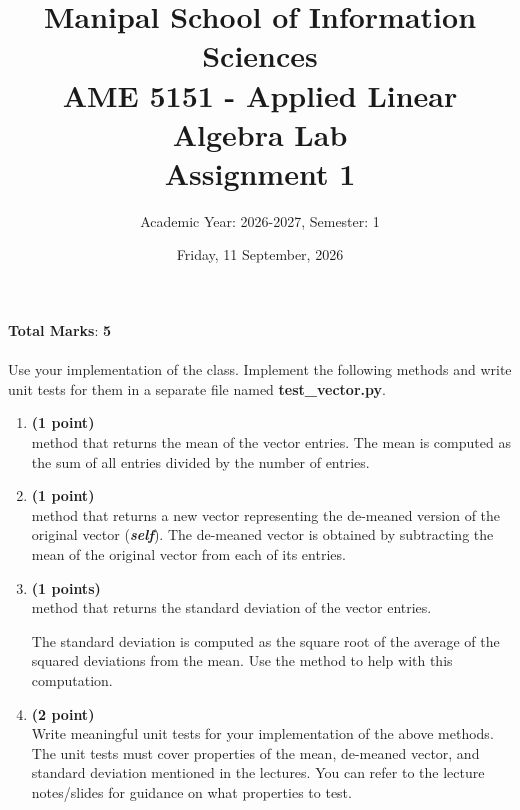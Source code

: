 \documentclass[12pt]{article}
\title{Manipal School of Information Sciences\\AME 5151 - Applied Linear Algebra Lab\vspace*{1em}\\Assignment 1\\}
\author{Academic Year: 2026-2027, Semester: 1}
\date{Friday, 11 September, 2026}
\begin{document}
\pagecolor{white!2}

\maketitle

\vspace*{-1em}\noindent{\color{black!70}{\rule{\textwidth}{0.8pt}}}

{}

\vspace*{1.5em}
\noindent\hfill {\textbf{Total Marks}: \textbf{5}}
\vspace*{-4pt}\\
\noindent{\color{black!70}{\rule{\textwidth}{0.8pt}}}\\


\noindent Use your implementation of the {\color{blue}{Vector}} class.
Implement the following methods and write unit tests for them
in a separate file named \textbf{test\_vector.py}.

\begin{enumerate}
    \item \textbf{(1 point)} \\
        {} method
        that returns the mean of the vector entries.
        The mean is computed as the sum of all entries divided by
        the number of entries.

    \item \textbf{(1 point)} \\
        {} method that
        returns a new vector representing the de-meaned version
        of the original vector ({\color{black!80}\textbf{\textit{self}}}).
        The de-meaned vector is obtained by subtracting the mean
        of the original vector from each of its entries.

    \item \textbf{(1 points)} \\
        {} method
        that returns the standard deviation of the vector entries.

        The standard deviation is computed as the square root of the
        average of the squared deviations from the mean.
        Use the {} method to help
        with this computation.

    \item \textbf{(2 point)} \\
         Write meaningful unit tests for your implementation of
         the above methods.
         The unit tests must cover properties of the mean, de-meaned vector,
         and standard deviation mentioned in the lectures.
         You can refer to the lecture notes/slides for guidance on
         what properties to test.

\end{enumerate}
\end{document}
